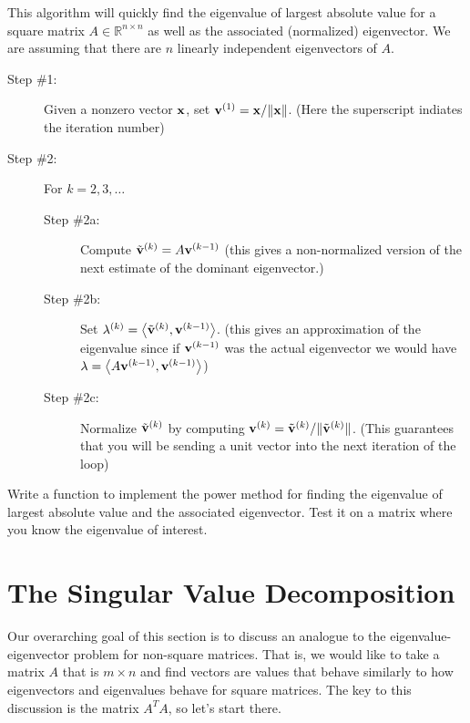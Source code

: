     \begin{technique} This algorithm will quickly find the 
        eigenvalue of largest absolute value for a square matrix $A \in \mathbb{R}^{n \times
        n}$ as well as the associated (normalized) eigenvector.  We are
        assuming that there are $n$ linearly independent eigenvectors of $A$.
        \begin{description}
            \item[Step \#1:] Given a nonzero vector ${\bf x}$, set ${\bf v}^{(1)} = {\bf x} / \|{\bf x}\|$.
                (Here the superscript indiates the iteration number)
            \item[Step \#2:] For $k=2, 3, \ldots$
                \begin{description}
                    \item[Step \#2a:] Compute $\tilde{{\bf v}}^{(k)} = A {\bf v}^{(k-1)}$ (this gives
                        a non-normalized version of the next estimate of the dominant
                        eigenvector.)
                    \item[Step \#2b:] Set $\lambda^{(k)} = \left< \tilde{{\bf v}}^{(k)} ,
                        {\bf v}^{(k-1)} \right>$.  (this gives an approximation of the eigenvalue
                        since if ${\bf v}^{(k-1)}$ was the actual eigenvector we would have
                        $\lambda = \left< A {\bf v}^{(k-1)}, {\bf v}^{(k-1)} \right>$)
                    \item[Step \#2c:] Normalize $\tilde{{\bf v}}^{(k)}$ by computing ${\bf v}^{(k)} =
                        \tilde{{\bf v}}^{(k)} / \| \tilde{{\bf v}}^{(k)} \|$. (This guarantees that
                        you will be sending a unit vector into the next iteration of the loop)
                \end{description}
        \end{description}
\end{technique}

\begin{problem}
    Write a \ProgLang function to implement the power method for finding the eigenvalue of
    largest absolute value and the associated eigenvector.  Test it on a matrix where you
    know the eigenvalue of interest.
\end{problem}


\newpage\section{The Singular Value Decomposition}
Our overarching goal of this section is to discuss an analogue to the
eigenvalue-eigenvector problem for non-square matrices.  That is, we would like to take a
matrix $A$ that is $m \times n$ and find vectors are values that behave similarly to how
eigenvectors and eigenvalues behave for square matrices.  The key to this discussion is
the matrix $A^T A$, so let's start there.

